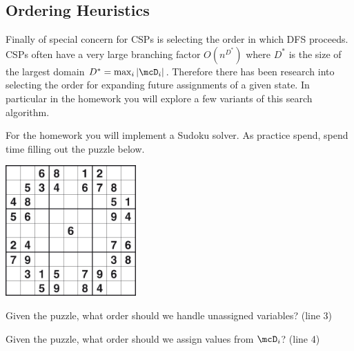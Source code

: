 \begin{algorithm}[h]
\begin{algorithmic}[1]
  \EndIf{}
   
  \EndIf{}
   

  \EndIf{}

  \EndIf{}
  \EndFor{}
  \EndProcedure{}
\end{algorithmic}
\end{algorithm}

\subsection{Ordering Heuristics}
  
Finally of special concern for CSPs is selecting the order in which DFS 
proceeds. CSPs often have a very large branching factor $O(n^{D^*})$ where 
$D^*$ is the size of the largest domain $D^* = \max_{i} |\mcD_i|$. Therefore 
there has been research into selecting the order for expanding future 
assignments of a given state. In particular in the homework you will explore a few variants of this search algorithm.

\begin{exercise}
  For the homework you will implement a Sudoku solver. As practice spend, spend time filling out the puzzle below.
\end{exercise}

\begin{center}
  \includegraphics[width=5cm]{../pics/sudoku}
\end{center}

\begin{exercise}
  Given the puzzle, what order should we handle unassigned variables? (line 3)
\end{exercise}


\begin{exercise}
  Given the puzzle, what order should we assign values from $\mcD_i$? (line 4)
\end{exercise}
